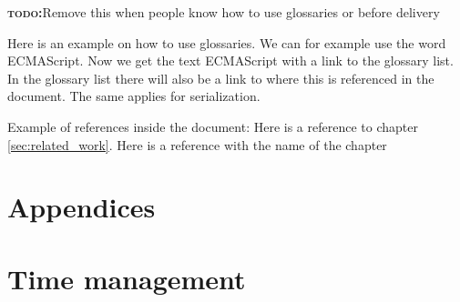 \documentclass[BSP,english,oneside]{classes/gucthesis}
\newcommand{\comment}[1]{\textcolor{blue}{\emph{#1}}}
\newcommand{\todo}[1]{{\par\noindent\textbf{\textsc{\color{Gray}todo:}}\color{Green}#1}}
\begin{document}


\todo{Remove this when people know how to use glossaries or before delivery}
Here is an example on how to use glossaries. We can for example use the word
\gls{ECMAScript}. Now we get the text ECMAScript with a link to the glossary
list. In the glossary list there will also be a link to where this is 
referenced in the document. The same applies for \gls{serialization}.

Example of references inside the document:
	Here is a reference to chapter \ref{sec:related_work}.
	Here is a reference with the name of the chapter 



\chapter{Appendices}

\appendix %




\printnoidxglossary[sort=word]

\chapter{Time management}
	\label{appx:time_management}
	




% 

% 

% 


\end{document}
